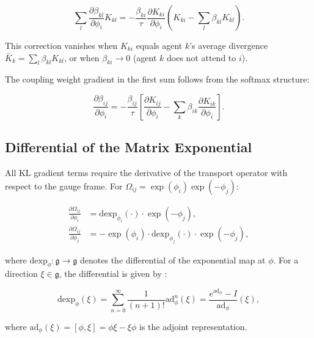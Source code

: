 \documentclass[twoside,11pt]{article}
\begin{document}
\begin{equation}
\sum_l \frac{\partial \beta_{kl}}{\partial \phi_i} K_{kl}
= -\frac{\beta_{ki}}{\tau}\frac{\partial K_{ki}}{\partial \phi_i}
\left(K_{ki} - \sum_l \beta_{kl} K_{kl}\right).
\label{eq:reverse_beta_grad_phi}
\end{equation}

This correction vanishes when $K_{ki}$ equals agent $k$'s average divergence $\bar{K}_k = \sum_l \beta_{kl} K_{kl}$, or when $\beta_{ki} \to 0$ (agent $k$ does not attend to $i$).

The coupling weight gradient in the first sum follows from the softmax structure:

\begin{equation}
\frac{\partial \beta_{ij}}{\partial \phi_i} = -\frac{\beta_{ij}}{\tau}\left[
\frac{\partial K_{ij}}{\partial \phi_i} - \sum_k \beta_{ik} \frac{\partial K_{ik}}{\partial \phi_i}
\right].
\label{eq:beta_grad_phi}
\end{equation}

\subsection{Differential of the Matrix Exponential}

All KL gradient terms require the derivative of the transport operator with respect to the gauge frame. For $\Omega_{ij} = \exp(\phi_i)\exp(-\phi_j)$:

\begin{align}
\frac{\partial \Omega_{ij}}{\partial \phi_i} &= \mathrm{dexp}_{\phi_i}(\cdot) \cdot \exp(-\phi_j), \label{eq:dOmega_dphi_i} \\
\frac{\partial \Omega_{ij}}{\partial \phi_j} &= -\exp(\phi_i) \cdot \mathrm{dexp}_{\phi_j}(\cdot) \cdot \exp(-\phi_j), \label{eq:dOmega_dphi_j}
\end{align}

where $\mathrm{dexp}_\phi: \mathfrak{g} \to \mathfrak{g}$ denotes the differential of the exponential map at $\phi$. For a direction $\xi \in \mathfrak{g}$, the differential is given by \citep{gallier2020differential,rossmann2002lie}:

\begin{equation}
\mathrm{dexp}_\phi(\xi) = \sum_{n=0}^{\infty} \frac{1}{(n+1)!} \mathrm{ad}_\phi^n(\xi) = \frac{e^{\mathrm{ad}_\phi} - I}{\mathrm{ad}_\phi}(\xi),
\label{eq:dexp_series}
\end{equation}

where $\mathrm{ad}_\phi(\xi) = [\phi, \xi] = \phi\xi - \xi\phi$ is the adjoint representation.
\end{document}
